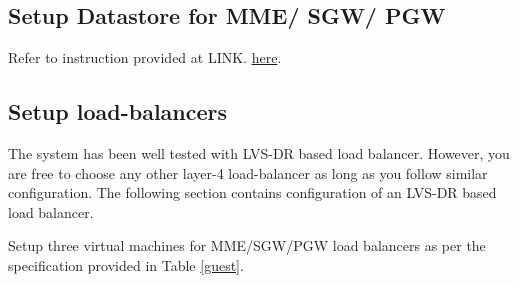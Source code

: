 \pdfminorversion=4\documentclass[hidelinks]{report}
\begin{document}
\subsection*{Setup Datastore for MME/ SGW/ PGW}
Refer to instruction provided at LINK.
 \href{https://github.com/networkedsystemsIITB/NFV\_LTE\_EPC/blob/master/NFV_LTE_EPC-2.0/KeyValueStore/Docs/UserManual.pdf}{\color{blue}here}.


\subsection*{Setup load-balancers}
\label{sds}
The system has been well tested with LVS-DR based load balancer. However, you are free to choose any other layer-4 load-balancer as long as you follow similar configuration. The following section contains configuration of an LVS-DR based load balancer.

Setup three virtual machines for MME/SGW/PGW load balancers as per the specification provided in Table \ref{guest}.
\end{document}
